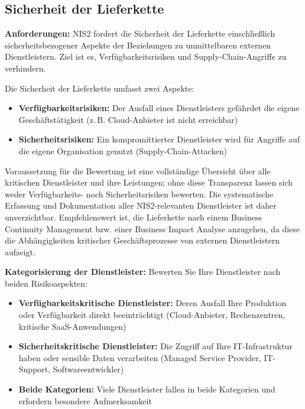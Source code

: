 \newpage
\subsection{Sicherheit der Lieferkette}
\textbf{Anforderungen:} NIS2 fordert die Sicherheit der Lieferkette einschließlich sicherheitsbezogener Aspekte der Beziehungen zu unmittelbaren externen Dienstleistern. Ziel ist es, Verfügbarkeitsrisiken und Supply-Chain-Angriffe zu verhindern.

Die Sicherheit der Lieferkette umfasst zwei Aspekte:
\begin{itemize}
    \item \textbf{Verfügbarkeitsrisiken:} Der Ausfall eines Dienstleisters gefährdet die eigene Geschäftstätigkeit (z.\,B. Cloud-Anbieter ist nicht erreichbar)
    \item \textbf{Sicherheitsrisiken:} Ein kompromittierter Dienstleister wird für Angriffe auf die eigene Organisation genutzt (Supply-Chain-Attacken)
\end{itemize}

Voraussetzung für die Bewertung ist eine vollständige Übersicht über alle kritischen Dienstleister und ihre Leistungen; ohne diese Transparenz lassen sich weder Verfügbarkeits- noch Sicherheitsrisiken bewerten. Die systematische Erfassung und Dokumentation aller NIS2-relevanten Dienstleister ist daher unverzichtbar. Empfehlenswert ist, die Lieferkette nach einem Business Continuity Management bzw. einer Business Impact Analyse anzugehen, da diese die Abhängigkeiten kritischer Geschäftsprozesse von externen Dienstleistern aufzeigt.

\textbf{Kategorisierung der Dienstleister:} Bewerten Sie Ihre Dienstleister nach beiden Risikoaspekten:
\begin{itemize}
    \item \textbf{Verfügbarkeitskritische Dienstleister:} Deren Ausfall Ihre Produktion oder Verfügbarkeit direkt beeinträchtigt (Cloud-Anbieter, Rechenzentren, kritische SaaS-Anwendungen)
    \item \textbf{Sicherheitskritische Dienstleister:} Die Zugriff auf Ihre IT-Infrastruktur haben oder sensible Daten verarbeiten (Managed Service Provider, IT-Support, Softwareentwickler)
    \item \textbf{Beide Kategorien:} Viele Dienstleister fallen in beide Kategorien und erfordern besondere Aufmerksamkeit
\end{itemize}


